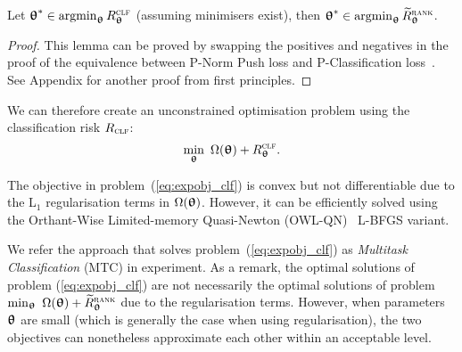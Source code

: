\begin{lemma}
\label{lm:rank2clf}
Let ${\bm{\uptheta}}^* \in \operatorname*{argmin}_{{\bm{\uptheta}}} R_{{\bm{\uptheta}}}^{\textsc{clf}}$ (assuming minimisers exist),
then ${\bm{\uptheta}}^* \in \operatorname*{argmin}_{{\bm{\uptheta}}} \widetilde R_{{\bm{\uptheta}}}^{\textsc{rank}}$.
\end{lemma}

\begin{proof}
This lemma can be proved by swapping the positives and negatives in the proof of 
the equivalence between P-Norm Push loss and P-Classification loss~\cite{ertekin2011equivalence}.
See Appendix for another proof from first principles.
\end{proof}

We can therefore create an unconstrained optimisation problem using the classification risk $R_\textsc{clf}$:
\begin{equation}
\label{eq:expobj_clf}
\min_{\bm{\uptheta}} \ \Omega({\bm{\uptheta}}) + R_{{\bm{\uptheta}}}^{\textsc{clf}}.
\end{equation}

The objective in problem~(\ref{eq:expobj_clf}) is convex but not differentiable due to the L$_1$ regularisation terms in $\Omega({\bm{\uptheta}})$.
However, it can be efficiently solved using the Orthant-Wise Limited-memory Quasi-Newton (OWL-QN)~\cite{andrew2007scalable} L-BFGS variant.

We refer the approach that solves problem~(\ref{eq:expobj_clf}) as \emph{Multitask Classification} (MTC) in experiment.
As a remark, the optimal solutions of problem (\ref{eq:expobj_clf}) are not necessarily the optimal solutions 
of problem $\min_{\bm{\uptheta}} \ \Omega({\bm{\uptheta}}) + \widetilde R_{{\bm{\uptheta}}}^{\textsc{rank}}$ due to the regularisation terms.
However, when parameters ${\bm{\uptheta}}$ are small (which is generally the case when using regularisation), the two objectives 
can nonetheless approximate each other within an acceptable level.





%

